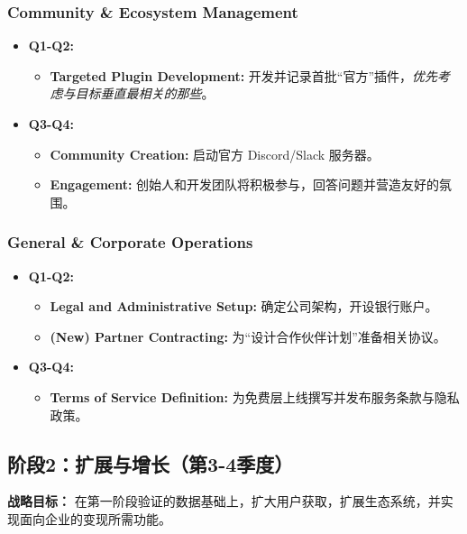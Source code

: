 \documentclass[11pt, a4paper, oneside]{article}
\begin{document}
\subsubsection{Community \& Ecosystem Management}
\begin{itemize}[leftmargin=*]
    \item \textbf{Q1-Q2:}
    \begin{itemize}
        \item \textbf{Targeted Plugin Development:} 开发并记录首批“官方”插件，\textit{优先考虑与目标垂直最相关的那些}。
    \end{itemize}
    \item \textbf{Q3-Q4:}
    \begin{itemize}
        \item \textbf{Community Creation:} 启动官方 Discord/Slack 服务器。
        \item \textbf{Engagement:} 创始人和开发团队将积极参与，回答问题并营造友好的氛围。
    \end{itemize}
\end{itemize}

\subsubsection{General \& Corporate Operations}
\begin{itemize}[leftmargin=*]
    \item \textbf{Q1-Q2:}
    \begin{itemize}
        \item \textbf{Legal and Administrative Setup:} 确定公司架构，开设银行账户。
        \item \textbf{(New) Partner Contracting:} 为“设计合作伙伴计划”准备相关协议。
    \end{itemize}
    \item \textbf{Q3-Q4:}
    \begin{itemize}
        \item \textbf{Terms of Service Definition:} 为免费层上线撰写并发布服务条款与隐私政策。
    \end{itemize}
\end{itemize}

\clearpage

\subsection{阶段2：扩展与增长（第3-4季度）}
\textbf{战略目标：} 在第一阶段验证的数据基础上，扩大用户获取，扩展生态系统，并实现面向企业的变现所需功能。
\end{document}
